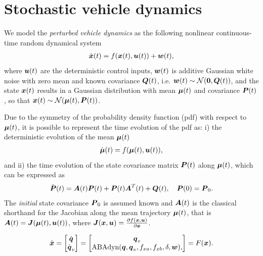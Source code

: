 \section{Stochastic vehicle dynamics}
\label{sec:stochastic_vehicle_dynamics} 

We model the \emph{perturbed vehicle dynamics} as the following nonlinear continuous-time random dynamical system
\begin{align}
\dot{\boldsymbol{x}}(t) = f(\boldsymbol{x}(t), \boldsymbol{u}(t)) + \boldsymbol{w}(t),
\end{align}
where $\boldsymbol{u}(t)$ are the deterministic control inputs, $\boldsymbol{w}(t)$ is additive Gaussian white noise with zero mean and known covariance $\boldsymbol{Q}(t)$, i.e. $\boldsymbol{w}(t) \sim \mathcal{N}(\boldsymbol{0}, \boldsymbol{Q}(t))$, and the state $\boldsymbol{x}(t)$ results in a Gaussian distribution with mean $\boldsymbol{\mu}(t)$ and covariance $\boldsymbol{P}(t)$, so that $\boldsymbol{x}(t) \sim \mathcal{N}(\boldsymbol{\mu}(t), \boldsymbol{P}(t))$.

Due to the symmetry of the probability density function (pdf) with respect to $\boldsymbol{\mu}(t)$, it is possible to represent the time evolution of the pdf as: i) the deterministic evolution of the mean $\boldsymbol{\mu}(t)$
\begin{align}
\dot{\boldsymbol{\mu}}(t) = f(\boldsymbol{\mu}(t), \boldsymbol{u}(t)),
\end{align}
and ii) the time evolution of the state covariance matrix $\boldsymbol{P}(t)$ along $\boldsymbol{\mu}(t)$, which can be expressed as
\begin{align}
\dot{\boldsymbol{P}}(t) = \boldsymbol{A}(t) \boldsymbol{P}(t) + \boldsymbol{P}(t) \boldsymbol{A}^T(t) + \boldsymbol{Q}(t),\quad \boldsymbol{P}(0) = \boldsymbol{P}_0.
\end{align}
The \emph{initial} state covariance $\boldsymbol{P}_0$ is assumed known and $\boldsymbol{A}(t)$ is the classical shorthand for the Jacobian along the mean trajectory $\boldsymbol{\mu}(t)$, that is $\boldsymbol{A}(t)=\boldsymbol{J}(\boldsymbol{\mu}(t),\boldsymbol{u}(t))$, where $\boldsymbol{J}(\boldsymbol{x}, \boldsymbol{u}) = \frac{\partial f(\boldsymbol{x}, \boldsymbol{u})}{\partial \boldsymbol{x}}$.

\begin{align}
\dbx = \begin{bmatrix}
              \dot{\bq}\\
              \dot{\bq}_v
             \end{bmatrix} =
             \begin{bmatrix}
              \bq_v\\
              \text{ABA}\text{dyn}(\bq, \bq_v, f_{xa}, f_{xb}, \delta, \bw),
             \end{bmatrix} = F(\bx).
	\label{eq:ABA_dyn}
\end{align}
               

